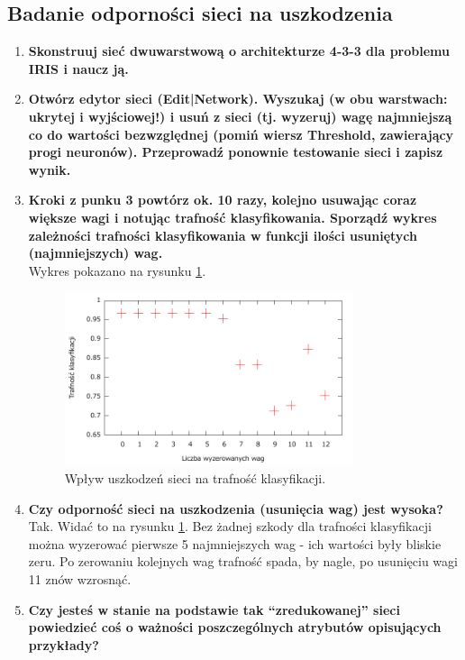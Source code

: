 \subsection{Badanie odporności sieci na uszkodzenia}
\begin{enumerate}
\item \textbf{Skonstruuj sieć dwuwarstwową o architekturze 4-3-3 dla problemu IRIS i naucz ją.}


\item \textbf{
Otwórz edytor sieci (Edit|Network). Wyszukaj (w obu warstwach: ukrytej i wyjściowej!) i usuń z sieci (tj. wyzeruj) wagę najmniejszą co do wartości bezwzględnej (pomiń wiersz Threshold, zawierający progi neuronów). Przeprowadź ponownie testowanie sieci i zapisz wynik.}

\item \textbf{
Kroki z punku 3 powtórz ok. 10 razy, kolejno usuwając coraz większe wagi i notując trafność klasyfikowania. Sporządź wykres zależności trafności klasyfikowania w funkcji ilości usuniętych (najmniejszych) wag.}
\\Wykres pokazano na rysunku \ref{fig:damages}.
\begin{figure}[h]
\centering
\includegraphics[width=0.8\textwidth]{dane/part1/zad8/damages}
\caption{Wpływ uszkodzeń sieci na trafność klasyfikacji.\label{fig:damages}}
\end{figure}

\item \textbf{
Czy odporność sieci na uszkodzenia (usunięcia wag) jest wysoka?}
\\Tak. Widać to na rysunku \ref{fig:damages}. Bez żadnej szkody dla trafności klasyfikacji można wyzerować pierwsze 5 najmniejszych wag - ich wartości były bliskie zeru. Po zerowaniu kolejnych wag trafność spada, by nagle, po usunięciu wagi 11 znów wzrosnąć.

\item \textbf{
Czy jesteś w stanie na podstawie tak “zredukowanej” sieci powiedzieć coś o ważności poszczególnych atrybutów opisujących przykłady?}


\end{enumerate}
